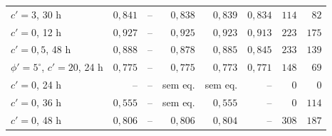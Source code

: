 \documentclass[11pt,a4paper]{article}
\numberwithin{equation}{section}
\begin{document}
{\begin{longtable}{lrrrrrrr}
$c' = 3$, 30 h & $0{,}841$ & -- & $0{,}838$ & $0{,}839$ & $0{,}834$ & $114$ & $82$ \\
$c' = 0$, 12 h & $0{,}927$ & -- & $0{,}925$ & $0{,}923$ & $0{,}913$ & $223$ & $175$ \\
$c' = 0{,}5$, 48 h & $0{,}888$ & -- & $0{,}878$ & $0{,}885$ & $0{,}845$ & $233$ & $139$ \\
$\phi' = 5^\circ$, $c' = 20$, 24 h & $0{,}775$ & -- & $0{,}775$ & $0{,}773$ & $0{,}771$ & $148$ & $69$ \\
$c' = 0$, 24 h & -- & -- & sem eq. & sem eq. & -- & $0$ & $0$ \\
$c' = 0$, 36 h & $0{,}555$ & -- & sem eq. & $0{,}555$ & -- & $0$ & $114$ \\
$c' = 0$, 48 h & $0{,}806$ & -- & $0{,}806$ & $0{,}804$ & -- & $308$ & $187$ \\
\end{longtable}
}
\end{document}
